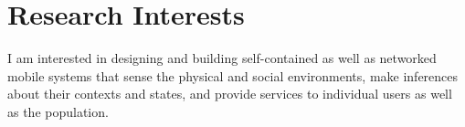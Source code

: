 \section{\sc Research Interests}
I am interested in designing and building self-contained as well as networked mobile systems that sense
the physical and social environments, make inferences about their
contexts and states, and provide services to individual users as well as the
population.
